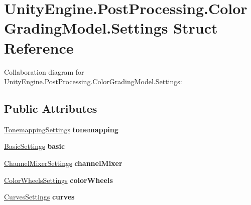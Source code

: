 \hypertarget{struct_unity_engine_1_1_post_processing_1_1_color_grading_model_1_1_settings}{}\section{Unity\+Engine.\+Post\+Processing.\+Color\+Grading\+Model.\+Settings Struct Reference}
\label{struct_unity_engine_1_1_post_processing_1_1_color_grading_model_1_1_settings}


Collaboration diagram for Unity\+Engine.\+Post\+Processing.\+Color\+Grading\+Model.\+Settings\+:
\subsection*{Public Attributes}
\begin{DoxyCompactItemize}
\item 
\mbox{\label{struct_unity_engine_1_1_post_processing_1_1_color_grading_model_1_1_settings_a85039084a9a35443b7cb1cd44511dd36}} 
\hyperlink{struct_unity_engine_1_1_post_processing_1_1_color_grading_model_1_1_tonemapping_settings}{Tonemapping\+Settings} {\bfseries tonemapping}
\item 
\mbox{\label{struct_unity_engine_1_1_post_processing_1_1_color_grading_model_1_1_settings_a14f6045f035a0672774bcc2d487375f6}} 
\hyperlink{struct_unity_engine_1_1_post_processing_1_1_color_grading_model_1_1_basic_settings}{Basic\+Settings} {\bfseries basic}
\item 
\mbox{\label{struct_unity_engine_1_1_post_processing_1_1_color_grading_model_1_1_settings_a8f0f189e614ef9d08b9bfcda0918897d}} 
\hyperlink{struct_unity_engine_1_1_post_processing_1_1_color_grading_model_1_1_channel_mixer_settings}{Channel\+Mixer\+Settings} {\bfseries channel\+Mixer}
\item 
\mbox{\label{struct_unity_engine_1_1_post_processing_1_1_color_grading_model_1_1_settings_ae47ed3b838650ac6bb08560d34b7cd83}} 
\hyperlink{struct_unity_engine_1_1_post_processing_1_1_color_grading_model_1_1_color_wheels_settings}{Color\+Wheels\+Settings} {\bfseries color\+Wheels}
\item 
\mbox{\label{struct_unity_engine_1_1_post_processing_1_1_color_grading_model_1_1_settings_aa60424f37437ea8273e0bf5857176086}} 
\hyperlink{struct_unity_engine_1_1_post_processing_1_1_color_grading_model_1_1_curves_settings}{Curves\+Settings} {\bfseries curves}
\end{DoxyCompactItemize}

